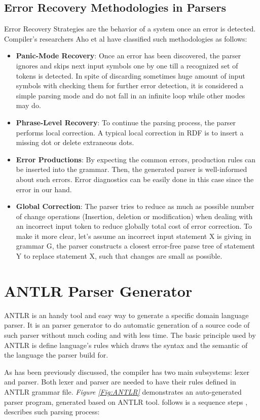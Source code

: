 \subsection{Error Recovery Methodologies in Parsers}
Error Recovery Strategies are the behavior of a system once an error is detected. Compiler's researchers Aho et al \cite{Aho2006}  have classified such methodologies as follows:
\begin{itemize}
	\item \textbf{Panic-Mode Recovery}: Once an error has been discovered, the parser ignores and skips next input symbols one by one till a recognized set of tokens is detected. In spite of discarding sometimes huge amount of input symbols with checking them for further error detection, it is considered a simple parsing mode and do not fall in an infinite loop while other modes may do.
	\item \textbf{Phrase-Level Recovery}: To continue the parsing process, the parser performs local correction. A typical local correction in RDF is to insert a missing dot or delete extraneous dots.
	\item \textbf{Error Productions}: By expecting the common errors, production rules can be inserted into the grammar. Then, the generated parser is well-informed about such errors. Error diagnostics can be easily done in this case since the error in our hand.
	\item \textbf{Global Correction}: The parser tries to reduce as much as possible number of change operations (Insertion, deletion or modification) when dealing with an incorrect input token to reduce globally total cost of error correction. To make it more clear, let's assume an incorrect input statement X is giving in grammar G, the parser constructs a closest error-free parse tree of statement Y to replace statement X, such that changes are small as possible. 
\end{itemize}


\section{ANTLR Parser Generator }
ANTLR is an handy tool and easy way to generate a specific domain language parser. It is an parser generator to do automatic generation of a source code of such parser without much coding and with less time. The basic principle used by ANTLR is define language's rules which draws the syntax and the semantic of the language the parser build for. 

\vspace{5mm} %
\par
 As has been previously discussed, the compiler has two main subsystems: lexer and parser. Both lexer and parser are needed to have their rules defined in ANTLR grammar file.  {\it Figure \ref{Fig:ANTLR}} demonstrates an auto-generated parser program, generated based on ANTLR tool. follows is a sequence steps \citealp{ANTLR:Tool:Online}, describes such parsing process:

